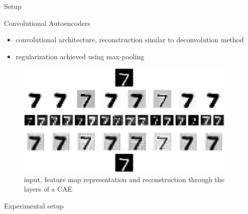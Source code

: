 \documentclass[final]{beamer}
\newlength{\sepwid}
\newlength{\onecolwid}
\begin{document}
\begin{frame}[t] %

\begin{columns}[t] %

\begin{column}{\sepwid}\end{column} %

\begin{column}{\onecolwid} %


\begin{alertblock}{Setup}

\begin{block}{Convolutional Autoencoders}

\begin{itemize}
	\item convolutional architecture, reconstruction similar to deconvolution method 
	\item regularization achieved using max-pooling
\end{itemize}

\begin{figure}
\includegraphics[width=0.8\linewidth]{graphics/feature_map_walkthrough_mnist.png}
\caption{input, feature map representation and reconstruction through the layers of a CAE}
\end{figure}

\end{block}


\begin{block}{Experimental setup}


\end{block}
\end{alertblock}
\end{column}
\end{columns}
\end{frame}
\end{document}
